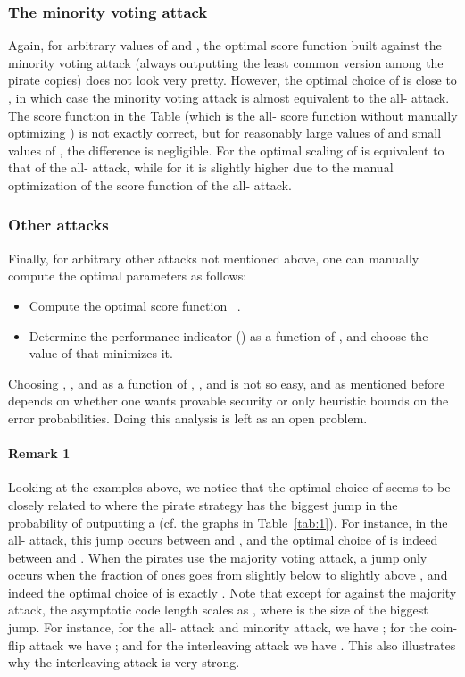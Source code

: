 \documentclass[10pt,a4paper,twocolumn]{article}
\begin{document}
\subsubsection{The minority voting attack}
Again, for arbitrary values of  and , the optimal score function built against the minority voting attack (always outputting the least common version among the pirate copies) does not look very pretty. However, the optimal choice of  is close to , in which case the minority voting attack is almost equivalent to the all- attack. The score function in the Table (which is the all- score function without manually optimizing ) is not exactly correct, but for reasonably large values of  and small values of , the difference is negligible. For  the optimal scaling of  is equivalent to that of the all- attack, while for  it is slightly higher due to the manual optimization of the score function of the all- attack.

\subsubsection*{Other attacks}
Finally, for arbitrary other attacks not mentioned above, one can manually compute the optimal parameters as follows:
\begin{itemize}
	\item Compute the optimal score function ~\cite[Cor.~7~and~8]{oosterwijk13}.
	\item Determine the performance indicator () as a function of , and choose the value of  that minimizes it.
\end{itemize}
Choosing , , and  as a function of , , and  is not so easy, and as mentioned before depends on whether one wants provable security or only heuristic bounds on the error probabilities. Doing this analysis is left as an open problem.

\paragraph*{Remark 1} Looking at the examples above, we notice that the optimal choice of  seems to be closely related to where the pirate strategy has the biggest jump in the probability of outputting a  (cf. the graphs in Table~\ref{tab:1}). For instance, in the all- attack, this jump occurs between  and , and the optimal choice of  is indeed between  and . When the pirates use the majority voting attack, a jump only occurs when the fraction of ones goes from slightly below  to slightly above , and indeed the optimal choice of  is exactly . Note that except for against the majority attack, the asymptotic code length scales as , where  is the size of the biggest jump. For instance, for the all- attack and minority attack, we have ; for the coin-flip attack we have ; and for the interleaving attack we have . This also illustrates why the interleaving attack is very strong.
\end{document}
